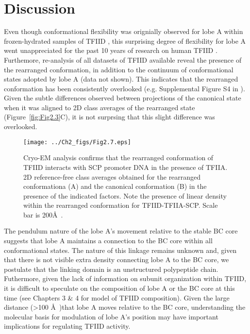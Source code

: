 \section{Discussion}
Even though conformational flexibility was orignially observed for lobe A within frozen-hydrated samples of TFIID \cite{Grob_1281}, this surprising degree of flexibility for lobe A went unappreciated for the past 10 years of research on human TFIID \cite{Andel_2407,Grob_1281,Liu_723,Liu_574}. Furthemore, re-analysis of all datasets of TFIID available reveal the presence of the rearranged conformation, in addition to the continuum of conformational states adopted by lobe A (data not shown). This indicates that the rearranged conformation has been consistently overlooked (e.g. Supplemental Figure S4 in \cite{Liu_723}). Given the subtle differences observed between projections of the canonical state when it was aligned to 2D class averages of the rearranged state (Figure~\ref{fig:Fig2.3}C), it is not surprsing that this slight difference was overlooked.\\
\begin{figure}
\centering
\texttt{[image: ../Ch2\_figs/Fig2.7.eps]}
\caption[Cryo-EM analysis confirms that the rearranged conformation of TFIID interacts with SCP promoter DNA in the presence of TFIIA]{Cryo-EM analysis confirms that the rearranged conformation of TFIID interacts with SCP promoter DNA in the presence of TFIIA. 2D reference-free class averages obtained for the rearranged conformationa (A) and the canonical conformation (B) in the presence of the indicated factors.  Note the presence of linear density within the rearranged conformation for TFIID-TFIIA-SCP.  Scale bar is 200\AA\ .}
\label{fig:Fig2.7}
\end{figure}
\indent The pendulum nature of the lobe A's movement relative to the stable BC core suggests that lobe A maintains a connection to the BC core within all conformational states. The nature of this linkage remains unknown and, given that there is not visible extra density connecting lobe A to the BC core, we postulate that the linking domain is an unstructured polypeptide chain. Futhermore, given the lack of information on subunit organization within TFIID, it is difficult to speculate on the composition of lobe A or the BC core at this time (see Chapters 3 \& 4 for model of TFIID composition). Given the large distance (\textgreater 100 \AA\ )that lobe A moves relative to the BC core, understanding the molecular basis for modulation of lobe A's position may have important implications for regulating TFIID activity.   \\ 
